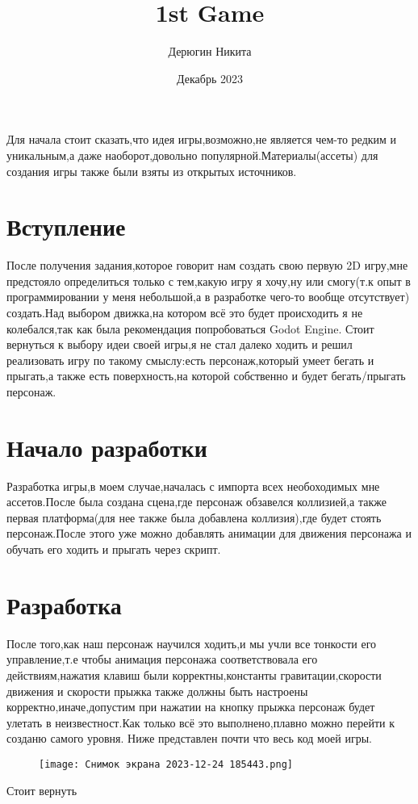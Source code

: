 \documentclass{article}
\title{1st Game}
\author{Дерюгин Никита }
\date{Декабрь 2023}
\begin{document}
	
	\maketitle
	Для начала стоит сказать,что идея игры,возможно,не является чем-то редким и уникальным,а даже наоборот,довольно популярной.Материалы(ассеты) для создания игры также были взяты из открытых источников.
	\section{Вступление}
	После получения задания,которое говорит нам создать свою первую 2D игру,мне предстояло определиться только с тем,какую игру я хочу,ну или смогу(т.к опыт в программировании у меня небольшой,а в разработке чего-то вообще отсутствует) создать.Над выбором движка,на котором всё это будет происходить я не колебался,так как была рекомендация попробоваться Godot Engine.
	Стоит вернуться к выбору идеи своей игры,я не стал далеко ходить и решил реализовать игру по такому смыслу:есть персонаж,который умеет бегать и прыгать,а также есть поверхность,на которой собственно и будет бегать/прыгать персонаж.
	\section {Начало разработки}
	Разработка игры,в моем случае,началась с импорта всех необоходимых мне ассетов.После была создана сцена,где персонаж обзавелся коллизией,а также первая платформа(для нее также была добавлена коллизия),где будет стоять персонаж.После этого уже можно добавлять анимации для движения персонажа и обучать его ходить и прыгать через скрипт.
	\section{Разработка}
	После того,как наш персонаж научился ходить,и мы учли все тонкости его управление,т.е чтобы анимация персонажа соответствовала его действиям,нажатия клавиш были корректны,константы гравитации,скорости движения и скорости прыжка также должны быть настроены корректно,иначе,допустим при нажатии на кнопку прыжка персонаж будет улетать в неизвестност.Как только всё это выполнено,плавно можно перейти к созданю самого уровня.
	Ниже представлен почти что весь код моей игры.
		\begin{figure}
		\centering
		\texttt{[image: Снимок экрана 2023-12-24 185443.png]}
		
	\end{figure}
	Стоит вернуть
\end{document}
